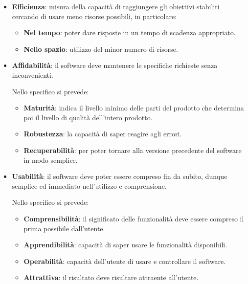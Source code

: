 \begin{itemize}
			\item \textbf{Efficienza}: misura della capacità di raggiungere gli obiettivi stabiliti cercando di usare meno risorse possibili, in particolare:
			
			\begin{itemize}
				\item \textbf{Nel tempo}: poter dare risposte in un tempo di scadenza appropriato.
				\item \textbf{Nello spazio}: utilizzo del minor numero di risorse.
			\end{itemize}
		
			\item \textbf{Affidabilità}: il software deve mantenere le specifiche richieste senza inconvenienti.
			
			Nello specifico si prevede:
			
			\begin{itemize}
				\item \textbf{Maturità}: indica il livello minimo delle parti del prodotto che determina poi il livello di qualità dell'intero prodotto.
				\item \textbf{Robustezza}: la capacità di saper reagire agli errori.
				\item \textbf{Recuperabilità}: per poter tornare alla versione precedente del software in modo semplice.
			\end{itemize}
		
			\item \textbf{Usabilità}: il software deve poter essere compreso fin da subito, dunque semplice ed immediato nell'utilizzo e comprensione.
			
			Nello specifico si prevede:
			
			\begin{itemize}
				\item \textbf{Comprensibilità}: il significato delle funzionalità deve essere compreso il prima possibile dall'utente.
				\item \textbf{Apprendibilità}: capacità di saper usare le funzionalità disponibili.
				\item \textbf{Operabilità}: capacità dell'utente di usare e controllare il software.
				\item \textbf{Attrattiva}: il risultato deve risultare attraente all'utente.
			\end{itemize}
		\end{itemize}
	
